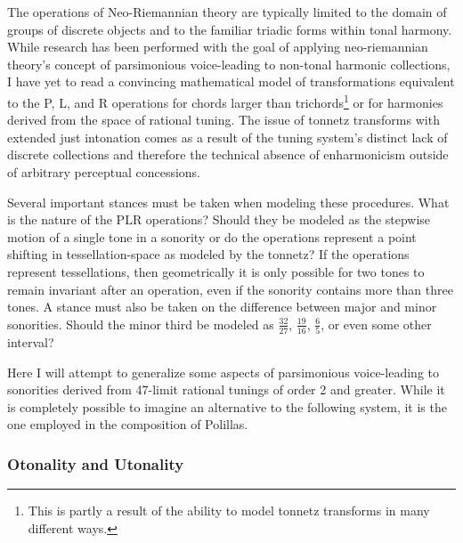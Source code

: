 The operations of Neo-Riemannian theory are typically limited to the domain of groups of discrete objects and to the familiar triadic forms within tonal harmony. While research has been performed with the goal of applying neo-riemannian theory’s concept of parsimonious voice-leading to non-tonal harmonic collections, I have yet to read a convincing mathematical model of transformations equivalent to the P, L, and R operations for chords larger than trichords\footnote{This is partly a result of the ability to model tonnetz transforms in many different ways.} or for harmonies derived from the space of rational tuning. The issue of tonnetz transforms with extended just intonation comes as a result of the tuning system's distinct lack of discrete collections and therefore the technical absence of enharmonicism outside of arbitrary perceptual concessions.


Several important stances must be taken when modeling these procedures. What is the nature of the PLR operations? Should they be modeled as the stepwise motion of a single tone in a sonority or do the operations represent a point shifting in tessellation-space as modeled by the tonnetz? If the operations represent tessellations, then geometrically it is only possible for two tones to remain invariant after an operation, even if the sonority contains more than three tones. A stance must also be taken on the difference between major and minor sonorities. Should the minor third be modeled as $\frac{32}{27}$, $\frac{19}{16}$, $\frac{6}{5}$, or even some other interval?

Here I will attempt to generalize some aspects of parsimonious voice-leading to sonorities derived from 47-limit rational tunings of order 2 and greater. While it is completely possible to imagine an alternative to the following system, it is the one employed in the composition of Polillas.

\subsubsection{Otonality and Utonality}

